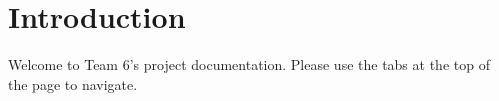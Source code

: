 \hypertarget{index_intro_sec}{}\section{Introduction}\label{index_intro_sec}
Welcome to Team 6's project documentation. Please use the tabs at the top of the page to navigate. 